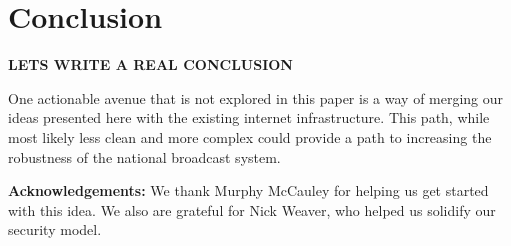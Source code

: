 \section{Conclusion}
\textbf{LETS WRITE A REAL CONCLUSION}


One actionable avenue that is not explored in this paper is a way of merging our ideas presented here with the existing internet infrastructure. This path, while most likely less clean and more complex could provide a path to  increasing the robustness of the national broadcast system.


\textbf{Acknowledgements:} We thank Murphy McCauley for helping us get started with this idea. We also are grateful for Nick Weaver, who helped us solidify our security model.


